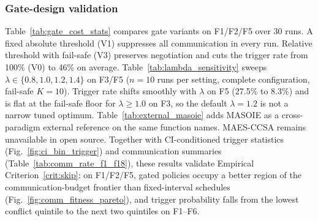 \documentclass[conference]{IEEEtran}
\begin{document}
\subsubsection{Gate-design validation}\label{sec:gate_validation}
Table~\ref{tab:gate_cost_stats} compares gate variants on F1/F2/F5 over 30 runs. A fixed absolute threshold (V1) suppresses all communication in every run. Relative threshold with fail-safe (V3) preserves negotiation and cuts the trigger rate from 100\% (V0) to 46\% on average. Table~\ref{tab:lambda_sensitivity} sweeps $\lambda\in\{0.8,1.0,1.2,1.4\}$ on F3/F5 ($n{=}10$ runs per setting, complete configuration, fail-safe $K{=}10$). Trigger rate shifts smoothly with $\lambda$ on F5 (27.5\% to 8.3\%) and is flat at the fail-safe floor for $\lambda\ge 1.0$ on F3, so the default $\lambda{=}1.2$ is not a narrow tuned optimum. Table~\ref{tab:external_masoie} adds MASOIE \cite{ref_masoie_2024} as a cross-paradigm external reference on the same function names. MAES-CCSA remains unavailable in open source. Together with CI-conditioned trigger statistics (Fig.~\ref{fig:ci_bin_trigger}) and communication summaries (Table~\ref{tab:comm_rate_f1_f18}), these results validate Empirical Criterion~\ref{crit:skip}: on F1/F2/F5, gated policies occupy a better region of the communication-budget frontier than fixed-interval schedules (Fig.~\ref{fig:comm_fitness_pareto}), and trigger probability falls from the lowest conflict quintile to the next two quintiles on F1--F6.

\begin{table}[!t]
\centering
\scriptsize
\caption{Gate-variant comparison on F1/F2/F5 (30 runs, LLSO). V0: always-on; V1: fixed absolute threshold; V2: relative threshold; V3: relative threshold with fail-safe. Metrics: communication trigger rate and wall time (mean$\pm$std).}
\label{tab:gate_cost_stats}
\setlength{\tabcolsep}{3pt}
\end{table}
\end{document}
